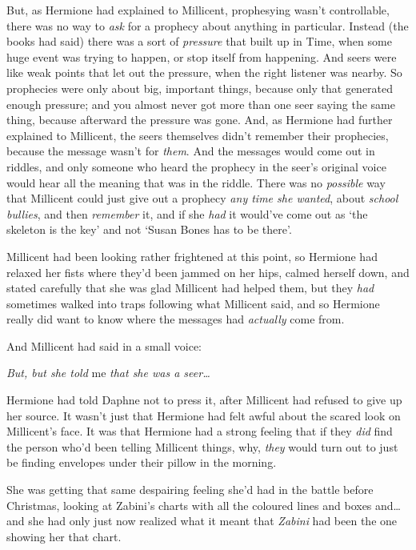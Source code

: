 But, as Hermione had explained to Millicent, prophesying wasn’t controllable,
there was no way to \emph{ask} for a prophecy about anything in particular.
Instead (the books had said) there was a sort of \emph{pressure} that built up
in Time, when some huge event was trying to happen, or stop itself from
happening. And seers were like weak points that let out the pressure, when the
right listener was nearby. So prophecies were only about big, important things,
because only that generated enough pressure; and you almost never got more than
one seer saying the same thing, because afterward the pressure was gone. And,
as Hermione had further explained to Millicent, the seers themselves didn’t
remember their prophecies, because the message wasn’t for \emph{them}. And the
messages would come out in riddles, and only someone who heard the prophecy in
the seer’s original voice would hear all the meaning that was in the riddle.
There was no \emph{possible} way that Millicent could just give out a prophecy
\emph{any time she wanted}, about \emph{school bullies}, and then
\emph{remember} it, and if she \emph{had} it would’ve come out as ‘the skeleton
is the key’ and not ‘Susan Bones has to be there’.

Millicent had been looking rather frightened at this point, so Hermione had
relaxed her fists where they’d been jammed on her hips, calmed herself down,
and stated carefully that she was glad Millicent had helped them, but they
\emph{had} sometimes walked into traps following what Millicent said, and so
Hermione really did want to know where the messages had \emph{actually} come
from.

And Millicent had said in a small voice:

\emph{But, but she told} me \emph{that she was a seer…}

Hermione had told Daphne not to press it, after Millicent had refused to give
up her source. It wasn’t just that Hermione had felt awful about the scared
look on Millicent’s face. It was that Hermione had a strong feeling that if
they \emph{did} find the person who’d been telling Millicent things, why,
\emph{they} would turn out to just be finding envelopes under their pillow in
the morning.

She was getting that same despairing feeling she’d had in the battle before
Christmas, looking at Zabini’s charts with all the coloured lines and boxes
and…and she had only just now realized what it meant that \emph{Zabini}
had been the one showing her that chart.

